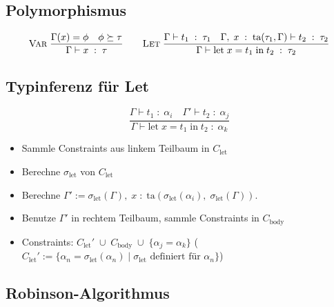 \documentclass[11pt]{scrartcl}
\begin{document}
\subsection{Polymorphismus}

\[
    \textsc{Var} \; \dfrac{\Gamma ( x ) = \phi \quad \phi \succeq \tau}{\Gamma \vdash x \; 
    : \; \tau} \qquad \textsc{Let} \; \dfrac{\Gamma \vdash t_1 \; : \; \tau_1 \quad 
    \Gamma, \; x \; : \; \textrm{ta} ( \tau_1, \Gamma ) \vdash t_2 \; : \; \tau_2}{\Gamma 
    \vdash \textrm{let} \; x = t_1  \; \textrm{in} \; t_2 \; : \; \tau_2}
\]

\subsection{Typinferenz für Let}

\[
    \dfrac{\Gamma \vdash t_1 \; : \; \alpha_i \quad 
    \Gamma' \vdash t_2 \; : \; \alpha_j}{\Gamma 
    \vdash \textrm{let} \; x = t_1  \; \textrm{in} \; t_2 \; : \; \alpha_k}
\]

\begin{itemize}
    \item Sammle Constraints aus linkem Teilbaum in \( C_\textrm{let} \)
    \item Berechne \( \sigma_\textrm{let} \) von \( C_\textrm{let} \)
    \item Berechne \( \Gamma' := \sigma_\textrm{let} ( \Gamma ), \; x \; : \; 
    \textrm{ta} ( \sigma_\textrm{let} ( \alpha_i ), \; \sigma_\textrm{let} ( \Gamma ) ) \).
    \item Benutze \( \Gamma' \) in rechtem Teilbaum, sammle Constraints in \( C_\textrm{body} \)
    \item Constraints: \( C_\textrm{let}' \; \cup \; C_\textrm{body} \; \cup \; 
    \{ \alpha_j = \alpha_k \} \) (\( C_\textrm{let}' := \{ \alpha_n = 
    \sigma_\textrm{let} ( \alpha_n ) \; | 
    \; \sigma_\textrm{let} \textrm{ definiert für } \alpha_n \} \))
\end{itemize}

\subsection{Robinson-Algorithmus}
\end{document}
